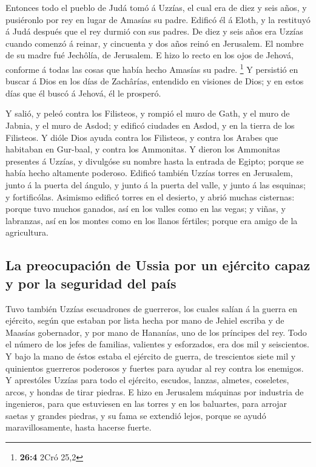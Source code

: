  Entonces todo el pueblo de Judá tomó á Uzzías, el cual
era de diez y seis años, y pusiéronlo por rey en lugar de Amasías su
padre.  Edificó él á Eloth, y la restituyó á Judá después
que el rey durmió con sus padres.  De diez y seis años era
Uzzías cuando comenzó á reinar, y cincuenta y dos años reinó en
Jerusalem. El nombre de su madre fué Jechôlía, de Jerusalem.
 E hizo lo recto en los ojos de Jehová, conforme á todas
las cosas que había hecho Amasías su padre. \footnote{\textbf{26:4} 2Cró
  25,2}  Y persistió en buscar á Dios en los días de
Zachârías, entendido en visiones de Dios; y en estos días que él buscó á
Jehová, él le prosperó.

 Y salió, y peleó contra los Filisteos, y rompió el muro
de Gath, y el muro de Jabnia, y el muro de Asdod; y edificó ciudades en
Asdod, y en la tierra de los Filisteos.  Y dióle Dios
ayuda contra los Filisteos, y contra los Arabes que habitaban en
Gur-baal, y contra los Ammonitas.  Y dieron los Ammonitas
presentes á Uzzías, y divulgóse su nombre hasta la entrada de Egipto;
porque se había hecho altamente poderoso.  Edificó también
Uzzías torres en Jerusalem, junto á la puerta del ángulo, y junto á la
puerta del valle, y junto á las esquinas; y fortificólas.
 Asimismo edificó torres en el desierto, y abrió muchas
cisternas: porque tuvo muchos ganados, así en los valles como en las
vegas; y viñas, y labranzas, así en los montes como en los llanos
fértiles; porque era amigo de la agricultura.

\hypertarget{la-preocupaciuxf3n-de-ussia-por-un-ejuxe9rcito-capaz-y-por-la-seguridad-del-pauxeds}{%
\subsection{La preocupación de Ussia por un ejército capaz y por la
seguridad del
país}\label{la-preocupaciuxf3n-de-ussia-por-un-ejuxe9rcito-capaz-y-por-la-seguridad-del-pauxeds}}

 Tuvo también Uzzías escuadrones de guerreros, los cuales
salían á la guerra en ejército, según que estaban por lista hecha por
mano de Jehiel escriba y de Maasías gobernador, y por mano de Hananías,
uno de los príncipes del rey.  Todo el número de los
jefes de familias, valientes y esforzados, era dos mil y seiscientos.
 Y bajo la mano de éstos estaba el ejército de guerra, de
trescientos siete mil y quinientos guerreros poderosos y fuertes para
ayudar al rey contra los enemigos.  Y aprestóles Uzzías
para todo el ejército, escudos, lanzas, almetes, coseletes, arcos, y
hondas de tirar piedras.  E hizo en Jerusalem máquinas
por industria de ingenieros, para que estuviesen en las torres y en los
baluartes, para arrojar saetas y grandes piedras, y su fama se extendió
lejos, porque se ayudó maravillosamente, hasta hacerse fuerte.

